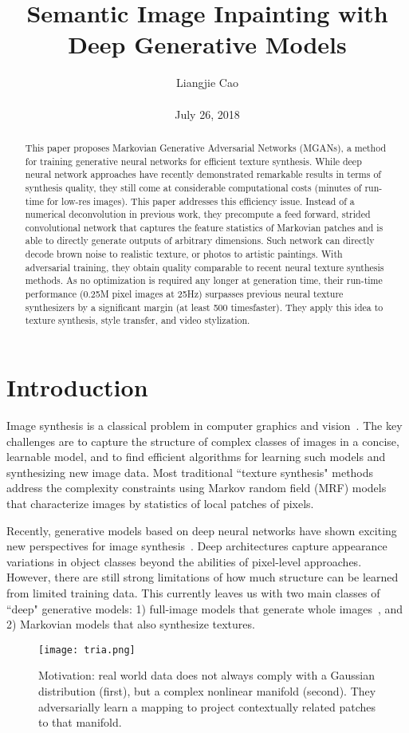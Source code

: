 \documentclass[10pt,twocolumn,letterpaper]{article}
\begin{document}
\title{\textbf{Semantic Image Inpainting with Deep Generative Models}}
\author{Liangjie Cao\\\\ July 26, 2018}
\maketitle
\begin{abstract}
This paper proposes Markovian Generative Adversarial Networks (MGANs), a method for training generative neural networks for efficient texture synthesis. While deep neural network approaches have recently demonstrated remarkable results in terms of synthesis quality, they still come at considerable computational costs (minutes of run-time for low-res images). This paper addresses this efficiency issue. Instead of a numerical deconvolution in previous work, they precompute a feed forward, strided convolutional network that captures the feature statistics of Markovian patches and is able to directly generate outputs of arbitrary dimensions. Such network can directly decode brown noise to realistic texture, or photos to artistic paintings. With adversarial training, they obtain quality comparable to recent neural texture synthesis methods. As no optimization is required any longer at generation time, their run-time performance (0.25M pixel images at 25Hz) surpasses previous neural texture synthesizers by a significant margin (at least 500 timesfaster). They apply this idea to texture synthesis, style transfer, and video stylization.
\end{abstract}
\section{Introduction}
Image synthesis is a classical problem in computer graphics and vision~\cite{name6,name33}. The key challenges are to capture the structure of complex classes of images in a concise, learnable model, and to find efficient algorithms for learning such models and synthesizing new image data. Most traditional ``texture synthesis" methods address the complexity constraints using Markov random field (MRF) models that characterize images by statistics of local patches of pixels.
\par Recently, generative models based on deep neural networks have shown exciting new perspectives for image synthesis~\cite{name10}. Deep architectures capture appearance variations in object classes beyond the abilities of pixel-level approaches. However, there are still strong limitations of how much structure can be learned from limited training data. This currently leaves us with two main classes of ``deep" generative models: 1) full-image models that generate whole images~\cite{name10}, and 2) Markovian models that also synthesize textures.
\begin{figure}[!htb]
\centering
\texttt{[image: tria.png]}\\
\caption{Motivation: real world data does not always comply with a Gaussian distribution (first), but a complex nonlinear manifold (second). They adversarially learn a mapping to project contextually related patches to that manifold.}\label{Figure1}
\end{figure}
\end{document}
